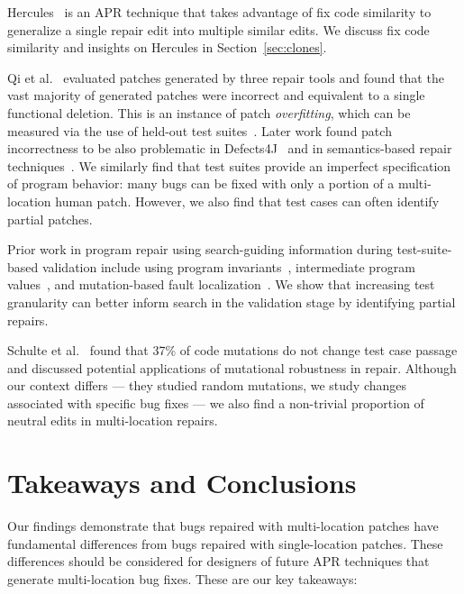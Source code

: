 \documentclass[10pt, conference]{IEEEtran}
\begin{document}
Hercules~\cite{saha2019harnessing} is an APR technique that takes advantage of
fix code similarity to generalize a single repair edit into multiple similar
edits. We discuss fix code similarity and insights on Hercules in
Section~\ref{sec:clones}.

Qi et al.~\cite{patch-correctness} evaluated patches generated by three repair
tools and found that the vast majority of generated patches were incorrect and
equivalent to a single functional deletion. This is an instance of patch
\emph{overfitting}, which can be measured via the use of held-out test
suites~\cite{Smith15fse}. Later work found patch incorrectness to be also
problematic in Defects4J~\cite{d4j-eval} and in semantics-based repair
techniques~\cite{Le2018}. We similarly find that test suites provide an
imperfect specification of program behavior: many bugs can be fixed with only a
portion of a multi-location human patch. However, we also find that test cases
can often identify partial patches.

Prior work in program repair using search-guiding information during
test-suite-based validation include using program
invariants~\cite{better-fitness, dinglyu}, intermediate program
values~\cite{source-code-checkpoint}, and mutation-based fault
localization~\cite{mut-analysis}.
We show that increasing test granularity can better inform search in the
validation stage by identifying partial repairs.

Schulte et al.~\cite{schulte} found that 37\% of code mutations do not change
test case passage and discussed potential applications of mutational robustness
in repair.  Although our context differs --- they studied random
mutations, we study changes associated with specific bug fixes --- we also find
a non-trivial proportion of neutral edits in multi-location repairs.


\section{Takeaways and Conclusions}
\label{sec:takeaways}

Our findings demonstrate that bugs repaired with multi-location patches have
fundamental differences from bugs repaired with single-location patches. These
differences should be considered for designers of future APR techniques that
generate multi-location bug fixes. These are our key takeaways:
\end{document}
